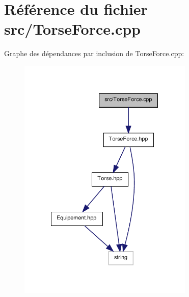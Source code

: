 \section{Référence du fichier src/\-Torse\-Force.cpp}
\label{_torse_force_8cpp}
Graphe des dépendances par inclusion de Torse\-Force.\-cpp\-:\nopagebreak
\begin{figure}[H]
\begin{center}
\leavevmode
\includegraphics[width=236pt]{_torse_force_8cpp__incl}
\end{center}
\end{figure}
